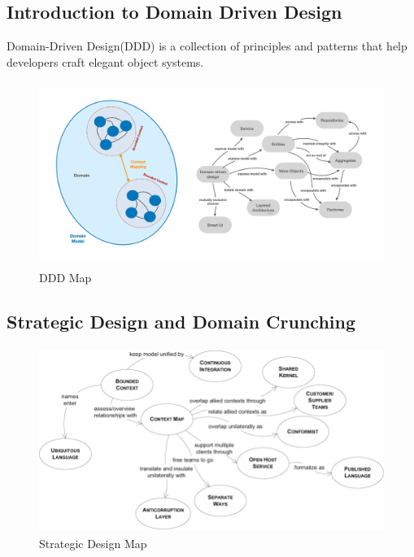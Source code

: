 \documentclass{beamer}
\begin{document}
		
	\subsection {Introduction to Domain Driven Design}
		\begin{frame}
			\scriptsize
			Domain-Driven Design(DDD) is a collection of principles and patterns that help developers craft elegant object systems.
			\begin{figure}[h]
				\includegraphics[width=0.8\linewidth , height=60mm]{img/domain-driven-arch.png}
				\caption{DDD Map}
			\end{figure}
		
		\end{frame}
	
	\subsection {Strategic Design and Domain Crunching}	
		\begin{frame}
			\begin{figure}[h]
				\includegraphics[width=0.8\linewidth , height=60mm]{img/strategic-map.png}
				\caption{Strategic Design Map}
			\end{figure}
		\end{frame}
	
\end{document}
